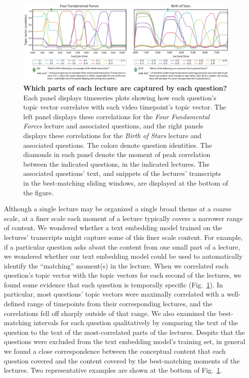 \documentclass[10pt]{article}
\begin{document}
\begin{figure}[tp]
    \centering
    \includegraphics[width=\textwidth]{figs/lecture-question-similarity}
    
    \caption{\textbf{Which parts of each lecture are captured by each
    question?} Each panel displays timeseries plots showing how each question's
    topic vector correlates with each video timepoint's topic vector. The left
    panel displays these correlations for the \textit{Four Fundamental Forces}
    lecture and associated questions, and the right panels displays these
    correlations for the \textit{Birth of Stars} lecture and associated
    questions. The colors denote question identities. The diamonds in each
    panel denote the moment of peak correlation between the indicated
    questions, in the indicated lectures. The associated questions' text, and
    snippets of the lectures' transcripts in the best-matching sliding windows,
    are displayed at the bottom of the figure.}
    
    \label{fig:question-correlations}
\end{figure}

Although a single lecture may be organized a single broad theme at a coarse
scale, at a finer scale each moment of a lecture typically covers a narrower
range of content. We wondered whether a text embedding model trained on the
lectures' transcripts might capture some of this finer scale content. For
example, if a particular question asks about the content from one small part of
a lecture, we wondered whether our text embedding model could be used to
automatically identify the ``matching'' moment(s) in the lecture. When we
correlated each question's topic vector with the topic vectors for each second
of the lectures, we found some evidence that each question is temporally
specific (Fig.~\ref{fig:question-correlations}). In particular, most questions'
topic vectors were maximally correlated with a well-defined range of timepoints
from their corresponding lectures, and the correlations fell off sharply
outside of that range. We also examined the best-matching intervals for each
question qualitatively by comparing the text of the question to the text of the
most-correlated parts of the lectures. Despite that the questions were excluded
from the text embedding model's training set, in general we found a close
correspondence between the conceptual content that each question covered and
the content covered by the best-matching moments of the lectures. Two
representative examples are shown at the bottom of
Fig.~\ref{fig:question-correlations}.
\end{document}
